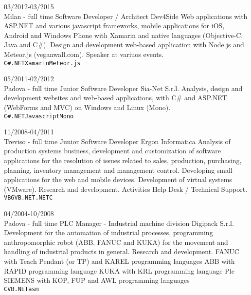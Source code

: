 \documentclass[9pt]{developercv}
\begin{document}
\begin{entrylist}
	\entry
		{03/2012-03/2015\\\footnotesize{Milan - full time}}
		{Software Developer / Architect}
		{Dev4Side}
		{Web applications with ASP.NET and various javascript frameworks, mobile applications for iOS, Android and Windows Phone with Xamarin and native languages (Objective-C, Java and C\#). Design and development web-based application with Node.js and Meteor.js (veganwall.com). Speaker at variuos events. \\
	   \texttt{C\#}\slashsep\texttt{.NET}\slashsep\texttt{Xamarin}\slashsep\texttt{Meteor.js}}

	\entry
		{05/2011-02/2012\\\footnotesize{Padova - full time}}
		{Junior Software Developer}
		{Sia-Net S.r.l.}
		{Analysis, design and development websites and web-based applications, with C\# and ASP.NET (WebForms and MVC) on Windows and Linux (Mono). \\
	   \texttt{C\#}\slashsep\texttt{.NET}\slashsep\texttt{Javascript}\slashsep\texttt{Mono}}

	 \entry
		{11/2008-04/2011\\\footnotesize{Treviso - full time}}
		{Junior Software Developer}
		{Ergon Informatica}
		{Analysis of production systems business, development and customization of software applications for the resolution of issues related to sales, production, purchasing, planning, inventory management and management control. Developing small applications for the web and mobile devices. Development of virtual systems (VMware). Research and development. Activities Help Desk / Technical Support. \\
	   \texttt{VB6}\slashsep\texttt{VB.NET}\slashsep\texttt{.NET}\slashsep\texttt{C}}

	 \entry
		{04/2004-10/2008\\\footnotesize{Padova - full time}}
		{PLC Manager - Industrial machine division}
		{Digipack S.r.l.}
		{Development for the automation of industrial processes, programming anthropomorphic robot (ABB, FANUC and KUKA) for the movement and handling of industrial products in general. Research and development. FANUC with Teach Pendant (or TP) and KAREL programming languages ABB with RAPID programming language KUKA with KRL programming language Plc SIEMENS with KOP, FUP and AWL programming languages \\
	   \texttt{C}\slashsep\texttt{VB.NET}\slashsep\texttt{asm}}

\end{entrylist}
\end{document}
